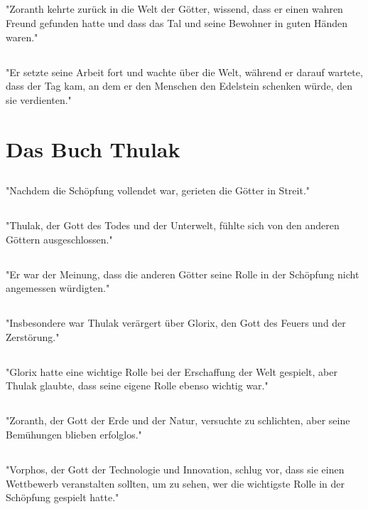 \documentclass{article}
\begin{document}
\subsection{}
"Zoranth kehrte zurück in die Welt der Götter, wissend, dass er einen wahren Freund gefunden hatte und dass das Tal und seine Bewohner in guten Händen waren."
\subsection{}
"Er setzte seine Arbeit fort und wachte über die Welt, während er darauf wartete, dass der Tag kam, an dem er den Menschen den Edelstein schenken würde, den sie verdienten."
\section{Das Buch Thulak}
\subsection{}
"Nachdem die Schöpfung vollendet war, gerieten die Götter in Streit."
\subsection{}
"Thulak, der Gott des Todes und der Unterwelt, fühlte sich von den anderen Göttern ausgeschlossen."
\subsection{}
"Er war der Meinung, dass die anderen Götter seine Rolle in der Schöpfung nicht angemessen würdigten."
\subsection{}
"Insbesondere war Thulak verärgert über Glorix, den Gott des Feuers und der Zerstörung."
\subsection{}
"Glorix hatte eine wichtige Rolle bei der Erschaffung der Welt gespielt, aber Thulak glaubte, dass seine eigene Rolle ebenso wichtig war."
\subsection{}
"Zoranth, der Gott der Erde und der Natur, versuchte zu schlichten, aber seine Bemühungen blieben erfolglos."
\subsection{}
"Vorphos, der Gott der Technologie und Innovation, schlug vor, dass sie einen Wettbewerb veranstalten sollten, um zu sehen, wer die wichtigste Rolle in der Schöpfung gespielt hatte."
\end{document}
